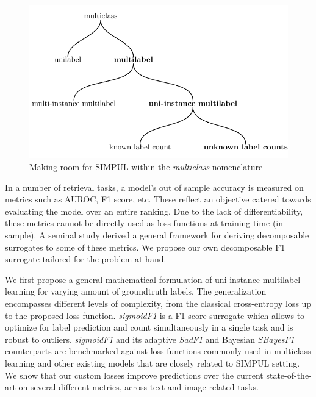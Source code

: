\begin{figure}[t]
\centering
\includegraphics[width=.9\linewidth]{./tree/Tree.pdf}
\caption{\label{fig:tree}
Making room for SIMPUL within the \emph{multiclass} nomenclature
}
\end{figure}

In a number of retrieval tasks, a model's out of sample accuracy is measured on metrics such as AUROC, F1 score, etc. These reflect an objective catered towards evaluating the model over an entire ranking. Due to the lack of differentiability, these metrics cannot be directly used as loss functions at training time (in-sample). A seminal study \cite{optimizableLosses} derived a general framework for deriving decomposable surrogates to some of these metrics.  We propose our own decomposable F1 surrogate tailored for the problem at hand.

We first propose a general mathematical formulation of uni-instance multilabel learning for varying amount of groundtruth labels. The generalization encompasses different levels of complexity, from the classical cross-entropy loss up to the proposed loss function. \emph{sigmoidF1} is a F1 score surrogate which allows to optimize for label prediction and count simultaneously in a single task and is robust to outliers.  \emph{sigmoidF1} and its adaptive \emph{SadF1} and Bayesian \emph{SBayesF1} counterparts are benchmarked against loss functions commonly used in multiclass learning and other existing models that are closely related to SIMPUL setting. We show that our custom losses improve predictions over the current state-of-the-art on several different metrics, across text and image related tasks.

